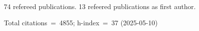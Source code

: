 74 refereed publications. 13 refeered publications as first author.

Total citations~=~4855; h-index~=~37 (2025-05-10)